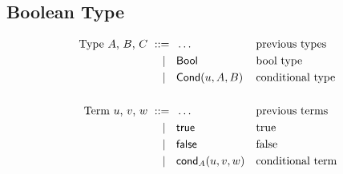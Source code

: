 \subsection{Boolean Type}
\label{sec:bool-type}

\begin{align*}
  \text{Type $A$, $B$, $C$}
    \ \mathrel{{:}{:}{=}}\    {}& \ldots                   && \text{previous types}\\
    \ \mid\ \  {}& \mathsf{Bool}                    && \text{bool type} \\
    \ \mid\ \  {}& \mathsf{Cond}(u,A,B)       && \text{conditional type} \\
  \\
  \text{Term $u$, $v$, $w$}
    \ \mathrel{{:}{:}{=}}\    {}& \ldots                   && \text{previous terms} \\
    \ \mid\ \  {}& \mathsf{true}                    && \text{true} \\
    \ \mid\ \  {}& \mathsf{false}                   && \text{false} \\
    \ \mid\ \  {}& \mathsf{cond}_{A}(u,v,w) && \text{conditional term}
\end{align*}

\newcommand{\rlTyBool}{\referTo{ty-bool}{rul:ty-bool}}
\newcommand{\showTyBool}{%
  \infer[\rulename{ty-bool}] %
  {\isctx{\G}}
  {\istype{\G}{\Bool}}
}

\newcommand{\rlTyCond}{\referTo{ty-cond}{rul:ty-cond}}
\newcommand{\showTyCond}{%
  \infer[\rulename{ty-cond}] %
  {\isterm{\G}{\uu}{\Bool} \\
   \istype{\G}{\A} \\
   \istype{\G}{\B}
  }
  {\istype{\G}{\Cond{\uu}{\A}{\B}}}
}

\newcommand{\rlTermTrue}{\referTo{term-true}{rul:term-true}}
\newcommand{\showTermTrue}{%
  \infer[\rulename{term-true}] %
  {\isctx{\G}}
  {\isterm{\G}{\true}{\Bool}}
}

\newcommand{\rlTermFalse}{\referTo{term-false}{rul:term-false}}
\newcommand{\showTermFalse}{%
  \infer[\rulename{term-false}] %
  {\isctx{\G}}
  {\isterm{\G}{\false}{\Bool}}
}

\newcommand{\rlTermCond}{\referTo{term-cond}{rul:term-cond}}
\newcommand{\showTermCond}{%
  \infer[\rulename{term-cond}] %
  {\isterm{\G}{\uu}{\Bool} \\
   \istype{\ctxextend{\G}{\Bool}}{\C} \\
   \isterm{\G}{\vv}{\subst{\C}{\sbzero{\G}{\Bool}{\true}}} \\
   \isterm{\G}{\ww}{\subst{\C}{\sbzero{\G}{\Bool}{\false}}}
  }
  {\isterm{\G}{\cond{\C}{\uu}{\vv}{\ww}}{\subst{\C}{\sbzero{\G}{\Bool}{\uu}}}}
}

